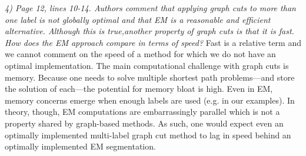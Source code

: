 \documentclass[11pt]{article}
\begin{document}
\newline
\newline
{\em 4) Page 12, lines 10-14. Authors comment that applying graph cuts
  to more than one label is not globally optimal and that EM is a
  reasonable and efficient alternative. Although this is true,another
  property of graph cuts is that it is fast. How does the EM approach
  compare in terms of speed?}
\newline
\newline
Fast is a relative term and we cannot comment on the speed of a method
for which we do not have an optimal implementation.  
The main computational challenge with graph cuts is memory.  Because one needs to
solve multiple shortest path problems---and store the solution of
each---the potential for memory bloat is high.  Even in EM, memory
concerns emerge when enough labels are used (e.g. in our examples).
In theory, though, EM computations are embarrassingly parallel which is
not a property shared by graph-based methods.  As such, one would
expect even an optimally implemented multi-label graph cut method to
lag in speed behind an optimally implemented EM segmentation.  
\end{document}
